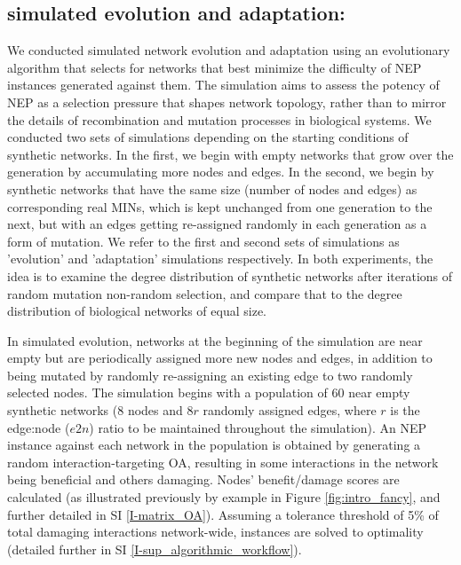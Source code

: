 \subsection{simulated evolution and adaptation:}\label{evolution_results}
    We conducted simulated network evolution and adaptation using an evolutionary algorithm that selects for networks that best minimize the difficulty of NEP instances generated against them. The simulation aims to assess the potency of NEP as a selection pressure that shapes network topology, rather than to mirror the details of recombination and mutation processes in biological systems. We conducted two sets of simulations depending on the starting conditions of synthetic networks. In the first, we begin with empty networks that grow over the generation by accumulating more nodes and edges. In the second, we begin by synthetic networks that have the same size (number of nodes and edges) as corresponding real MINs, which is kept unchanged from one generation to the next, but with an edges getting re-assigned randomly in each generation as a form of mutation. We refer to the first and second sets of simulations as 'evolution' and 'adaptation' simulations respectively. In both experiments, the idea is to examine the degree distribution of synthetic networks after iterations of random mutation non-random selection, and compare that  to the degree distribution of biological networks of equal size.

    In simulated evolution, networks at the beginning of the simulation are near empty but are periodically assigned more new nodes and edges, in addition to being mutated by randomly re-assigning an existing edge to two randomly selected nodes. The simulation begins with a population of 60 near empty synthetic networks (8 nodes and $8r$ randomly assigned edges, where $r$ is the edge:node ($e2n$) ratio to be maintained throughout the simulation). An NEP instance against each network in the population is obtained by generating a random interaction-targeting OA, resulting in some interactions in the network being beneficial and others damaging. Nodes' benefit/damage scores are calculated (as illustrated previously by example in Figure \ref{fig:intro_fancy}, and further detailed in SI \ref{I-matrix_OA}). Assuming a tolerance threshold of 5\% of total damaging interactions network-wide, instances are solved to optimality (detailed further in SI \ref{I-sup_algorithmic_workflow}).

